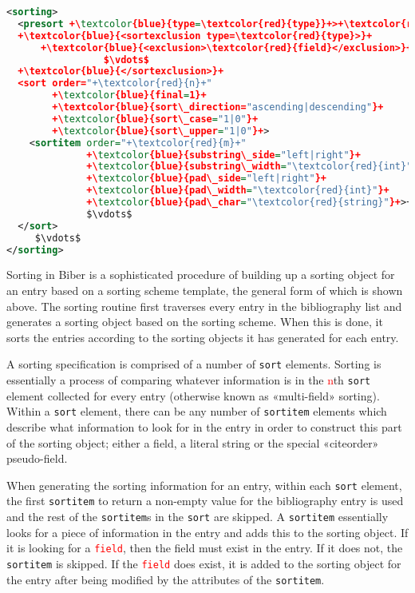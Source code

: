 \documentclass{ltxdockit}
\newcommand*{\biber}{Biber\xspace}
\begin{document}
\begin{lstlisting}[language=xml,escapechar=+,mathescape=true]
<sorting>
  <presort +\textcolor{blue}{type=\textcolor{red}{type}}+>+\textcolor{red}{string}+</presort>
  +\textcolor{blue}{<sortexclusion type=\textcolor{red}{type}>}+
      +\textcolor{blue}{<exclusion>\textcolor{red}{field}</exclusion>}+
                 $\vdots$
  +\textcolor{blue}{</sortexclusion>}+
  <sort order="+\textcolor{red}{n}+"
        +\textcolor{blue}{final=1}+
        +\textcolor{blue}{sort\_direction="ascending|descending"}+
        +\textcolor{blue}{sort\_case="1|0"}+
        +\textcolor{blue}{sort\_upper="1|0"}+>
    <sortitem order="+\textcolor{red}{m}+"
              +\textcolor{blue}{substring\_side="left|right"}+
              +\textcolor{blue}{substring\_width="\textcolor{red}{int}"}+
              +\textcolor{blue}{pad\_side="left|right"}+
              +\textcolor{blue}{pad\_width="\textcolor{red}{int}"}+
              +\textcolor{blue}{pad\_char="\textcolor{red}{string}"}+>+\textcolor{red}{field|literal|citeorder}+</sortitem>
              $\vdots$
  </sort>
     $\vdots$
</sorting>
\end{lstlisting}

Sorting in \biber is a sophisticated procedure of building up a sorting
object for an entry based on a sorting scheme template, the general form of
which is shown above. The sorting routine first traverses every entry in
the bibliography list and generates a sorting object based on the sorting
scheme. When this is done, it sorts the entries according to the sorting
objects it has generated for each entry.

A sorting specification is comprised of a number of \texttt{sort} elements.
Sorting is essentially a process of comparing whatever information is in
the \textcolor{red}{n}th \texttt{sort} element collected for every entry
(otherwise known as «multi-field» sorting). Within a \texttt{sort} element,
there can be any number of \texttt{sortitem} elements which describe what
information to look for in the entry in order to construct this part of the
sorting object; either a field, a literal string or the special «citeorder»
pseudo-field.

When generating the sorting information for an entry, within each
\texttt{sort} element, the first \texttt{sortitem} to return a non-empty
value for the bibliography entry is used and the rest of the
\texttt{sortitem}s in the \texttt{sort} are skipped. A \texttt{sortitem}
essentially looks for a piece of information in the entry and adds this to
the sorting object. If it is looking for a \textcolor{red}{\texttt{field}},
then the field must exist in the entry. If it does not, the
\texttt{sortitem} is skipped. If the \textcolor{red}{\texttt{field}} does
exist, it is added to the sorting object for the entry after being modified
by the attributes of the \texttt{sortitem}.
\end{document}
